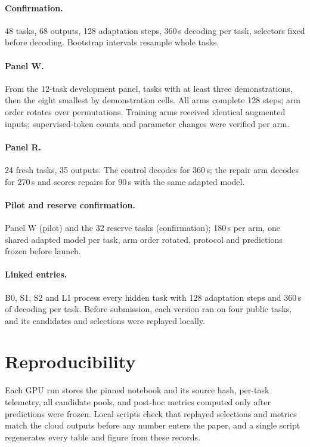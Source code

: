 \documentclass[10pt,twocolumn]{article}
\theoremstyle{plain}\newtheorem{proposition}{Proposition}
\theoremstyle{definition}\newtheorem{corollary}{Corollary}
\begin{document}
\paragraph{Confirmation.} 48 tasks, 68 outputs, 128 adaptation steps, 360\,s decoding per task, selectors fixed before decoding. Bootstrap intervals resample whole tasks.
\paragraph{Panel W.} From the 12-task development panel, tasks with at least three demonstrations, then the eight smallest by demonstration cells. All arms complete 128 steps; arm order rotates over permutations. Training arms received identical augmented inputs; supervised-token counts and parameter changes were verified per arm.
\paragraph{Panel R.} 24 fresh tasks, 35 outputs. The control decodes for 360\,s; the repair arm decodes for 270\,s and scores repairs for 90\,s with the same adapted model.
\paragraph{Pilot and reserve confirmation.} Panel W (pilot) and the 32 reserve tasks (confirmation); 180\,s per arm, one shared adapted model per task, arm order rotated, protocol and predictions frozen before launch.
\paragraph{Linked entries.} B0, S1, S2 and L1 process every hidden task with 128 adaptation steps and 360\,s of decoding per task. Before submission, each version ran on four public tasks, and its candidates and selections were replayed locally.

\section{Reproducibility}
Each GPU run stores the pinned notebook and its source hash, per-task telemetry, all candidate pools, and post-hoc metrics computed only after predictions were frozen. Local scripts check that replayed selections and metrics match the cloud outputs before any number enters the paper, and a single script regenerates every table and figure from these records.
\end{document}
